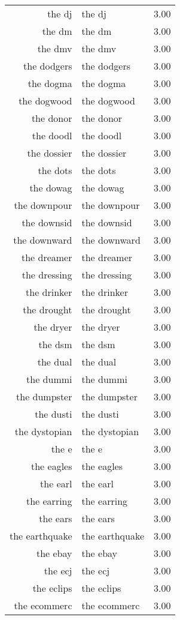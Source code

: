 \begin{table}[ht]
\begin{tabular}{rlr}
  the dj & the dj & 3.00 \\ 
  the dm & the dm & 3.00 \\ 
  the dmv & the dmv & 3.00 \\ 
  the dodgers & the dodgers & 3.00 \\ 
  the dogma & the dogma & 3.00 \\ 
  the dogwood & the dogwood & 3.00 \\ 
  the donor & the donor & 3.00 \\ 
  the doodl & the doodl & 3.00 \\ 
  the dossier & the dossier & 3.00 \\ 
  the dots & the dots & 3.00 \\ 
  the dowag & the dowag & 3.00 \\ 
  the downpour & the downpour & 3.00 \\ 
  the downsid & the downsid & 3.00 \\ 
  the downward & the downward & 3.00 \\ 
  the dreamer & the dreamer & 3.00 \\ 
  the dressing & the dressing & 3.00 \\ 
  the drinker & the drinker & 3.00 \\ 
  the drought & the drought & 3.00 \\ 
  the dryer & the dryer & 3.00 \\ 
  the dsm & the dsm & 3.00 \\ 
  the dual & the dual & 3.00 \\ 
  the dummi & the dummi & 3.00 \\ 
  the dumpster & the dumpster & 3.00 \\ 
  the dusti & the dusti & 3.00 \\ 
  the dystopian & the dystopian & 3.00 \\ 
  the e & the e & 3.00 \\ 
  the eagles & the eagles & 3.00 \\ 
  the earl & the earl & 3.00 \\ 
  the earring & the earring & 3.00 \\ 
  the ears & the ears & 3.00 \\ 
  the earthquake & the earthquake & 3.00 \\ 
  the ebay & the ebay & 3.00 \\ 
  the ecj & the ecj & 3.00 \\ 
  the eclips & the eclips & 3.00 \\ 
  the ecommerc & the ecommerc & 3.00 \\ 

\end{tabular}
\end{table}
